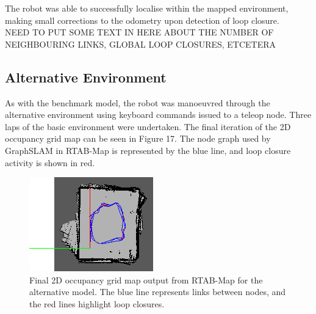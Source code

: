 \documentclass[a4paper]{article}
\begin{document}
The robot was able to successfully localise within the mapped environment, making small corrections to the odometry upon detection of loop closure.\\

NEED TO PUT SOME TEXT IN HERE ABOUT THE NUMBER OF NEIGHBOURING LINKS, GLOBAL LOOP CLOSURES, ETCETERA

\newpage

\subsection{Alternative Environment}
As with the benchmark model, the robot was manoeuvred through the alternative environment using keyboard commands issued to a teleop node. Three laps of the basic environment were undertaken. The final iteration of the 2D occupancy grid map can be seen in Figure 17. The node graph used by GraphSLAM in RTAB-Map is represented by the blue line, and loop closure activity is shown in red.
\begin{figure}[h]
\centering
\includegraphics[scale=1.2]{slam_house_2_graph_view}
\caption{Final 2D occupancy grid map output from RTAB-Map for the alternative model. The blue line represents links between nodes, and the red lines highlight loop closures.}
\end{figure}
\end{document}
